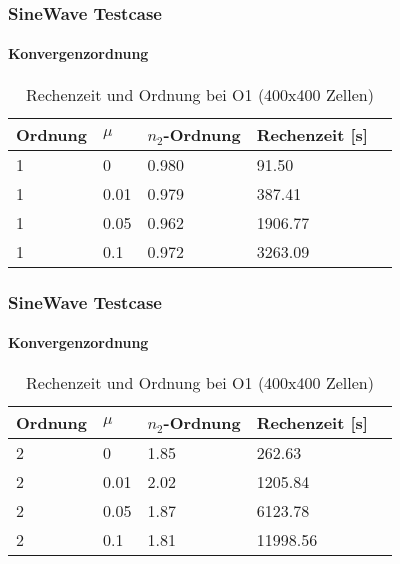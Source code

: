 \documentclass[
	11pt, %
	aspectratio=169, %
]{beamer}
\begin{document}



\begin{frame}
	\frametitle{SineWave Testcase}
	\framesubtitle{Konvergenzordnung}

		\begin{table}
			\begin{tabular}{l l l l l}
				\toprule
				Ordnung & $\mu$  & $n_2$-Ordnung & Rechenzeit [s]\\
				\midrule
				1 & 0 & 0.980 & 91.50\\
				1 & 0.01  & 0.979& 387.41\\
				1 & 0.05 &  0.962 & 1906.77\\
				1 & 0.1 &  0.972  & 3263.09\\
				\bottomrule
			\end{tabular}
			\caption{Rechenzeit und Ordnung bei O1 (400x400 Zellen)}
	\end{table}


\end{frame}



\begin{frame}
	\frametitle{SineWave Testcase}
	\framesubtitle{Konvergenzordnung}

		\begin{table}
			\begin{tabular}{l l l l l}
				\toprule
				Ordnung & $\mu$  & $n_2$-Ordnung & Rechenzeit [s]\\
				\midrule
				2 & 0 &  1.85 &262.63 \\
				2 & 0.01 &2.02 &1205.84 \\
				2 & 0.05  & 1.87& 6123.78 \\
				2 & 0.1 &  1.81& 11998.56\\
				\bottomrule
			\end{tabular}
			\caption{Rechenzeit und Ordnung bei O1 (400x400 Zellen)}
	\end{table}


\end{frame}
\end{document}
